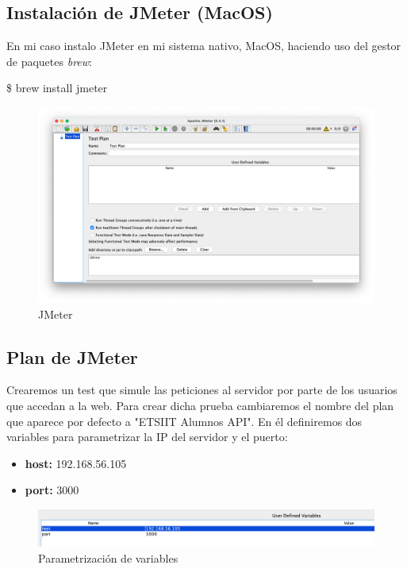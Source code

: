 \subsection{Instalación de JMeter (MacOS)}
En mi caso instalo JMeter en mi sistema nativo, MacOS, haciendo uso del gestor de paquetes \emph{brew}:
\begin{tcolorbox}[colback=black!10, halign=left]
    \$ brew install jmeter
\end{tcolorbox}

\begin{figure}[H]
    \centering
    \includegraphics[scale=0.33]{images/jmeter.png}
    \caption{JMeter}
    \label{fig:jmeter}
\end{figure}

\subsection{Plan de JMeter}
Crearemos un test que simule las peticiones al servidor por parte de los usuarios que accedan a la web. Para crear dicha prueba cambiaremos el nombre del plan que aparece
por defecto a "ETSIIT Alumnos API". En él definiremos dos variables para parametrizar la IP del servidor y el puerto:
\begin{itemize}
    \item \textbf{host:} 192.168.56.105
    \item \textbf{port:} 3000
\end{itemize}

\begin{figure}[H]
    \centering
    \includegraphics[scale=0.45]{images/variables.png}
    \caption{Parametrización de variables}
    \label{fig:variables}
\end{figure}

